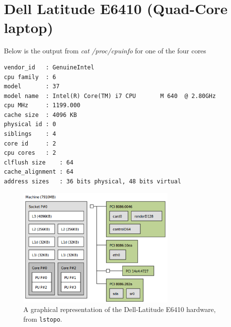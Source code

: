 \documentclass{softwaremanual}
\begin{document}
\section{Dell Latitude E6410 (Quad-Core laptop)}\label{sec:DellLaptop}
  Below is the output from \textit{cat /proc/cpuinfo} for one of the four cores
  \begin{verbatim}
vendor_id	: GenuineIntel
cpu family	: 6
model		: 37
model name	: Intel(R) Core(TM) i7 CPU       M 640  @ 2.80GHz
cpu MHz		: 1199.000
cache size	: 4096 KB
physical id	: 0
siblings	: 4
core id		: 2
cpu cores	: 2
clflush size	: 64
cache_alignment	: 64
address sizes	: 36 bits physical, 48 bits virtual
  \end{verbatim}

\begin{figure}
\begin{center}
\includegraphics[width=0.7\textwidth]{projectFigures/dell-latitudee6410.png}
\caption{A graphical representation of the Dell-Latitude E6410 hardware, from \texttt{lstopo}.}
\end{center}
\end{figure}

\pagebreak



\end{document}
